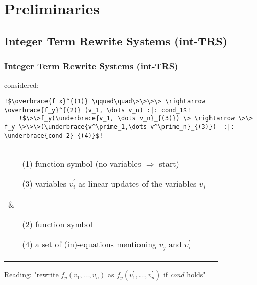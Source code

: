 \section{Preliminaries}

\subsection{Integer Term Rewrite Systems (int-TRS) }
\begin{frame}[fragile] %
	\frametitle{Integer Term Rewrite Systems (int-TRS)}
	\its considered:
	\begin{lstlisting}[escapechar=!]
	!$\overbrace{f_x}^{(1)} \qquad\quad\>\>\>\> \rightarrow \overbrace{f_y}^{(2)} (v_1, \dots v_n) :|: cond_1$!
	!$\>\>f_y(\underbrace{v_1, \dots v_n}_{(3)}) \> \rightarrow \>\> f_y \>\>\>(\underbrace{v^\prime_1,\dots v^\prime_n}_{(3)})  :|: \underbrace{cond_2}_{(4)}$!
	\end{lstlisting}
	
	\begin{tabular}{ll}
		\parbox{5cm}{
		\begin{enumerate}
			\item[(1)] function symbol (no variables $\Rightarrow$ start)
			\item[(3)] variables $v^\prime_i$ as linear updates of the variables $v_j$
		\end{enumerate}}
		&
		\parbox{5cm}{
			\begin{enumerate}
				\item[(2)] function symbol
				\item[(4)] a set of (in)-equations mentioning $v_j$ and $v^\prime_i$
		\end{enumerate}}
	\end{tabular}

	Reading: "rewrite $f_y(v_1,\dots,v_n)$ as $f_y(v^\prime_1,\dots,v^\prime_n)$ if \textit{cond} holds"
\end{frame}

